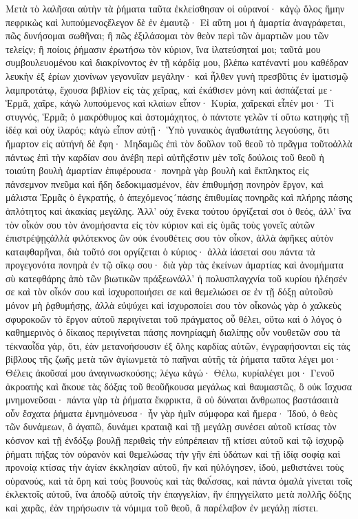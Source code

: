 Μετὰ τὸ λαλῆσαι αὐτὴν τὰ ῥήματα ταῦτα ἐκλείσθησαν οἱ οὐρανοί· κἀγῲ ὅλος ἤμην πεφρικὼς καὶ λυπούμενοςἔλεγον δὲ ἐν ἐμαυτῷ· Εἰ αὕτη μοι ἡ ἁμαρτία ἀναγράφεται, πῶς δυνήσομαι σωθῆναι; ἢ πῶς ἐξιλάσομαι τὸν θεὸν περὶ τῶν ἁμαρτιῶν μου τῶν τελείςν; ἢ ποίοις ῥήμασιν ἐρωτήσω τὸν κύριον, ἵνα ἱλατεύσηταί μοι; ταῦτά μου συμβουλευομένου καὶ διακρίνοντος ἐν τῇ κάρδίᾳ μου, βλέπω κατέναντί μου καθέδραν λευκὴν ἐξ ἐρίων χιονίνων γεγονυῖαν μεγάλην· καὶ ἦλθεν γυνὴ πρεσβῦτις ἐν ἱματισμῷ λαμπροτάτῳ, ἔχουσα βιβλίον εἰς τὰς χεῖρας, καὶ ἐκάθισεν μόνη καὶ ἀσπάζεταί με· Ἑρμᾶ, χαῖρε, κἀγὼ λυπούμενος καὶ κλαίων εἶπον· Κυρία, χαῖρεκαὶ εἶπέν μοι· Τί στυγνός, Ἑρμᾶ; ὁ μακρόθυμος καὶ ἀστομάχητος, ὁ πάντοτε γελῶν τί οὕτω κατηφὴς τῇ ἰδέᾳ καὶ οὐχ ἱλαρός; κἀγὼ εἶπον αὐτῇ· Ὑπὸ γυναικὸς ἀγαθωτάτης λεγούσης, ὅτι ἥμαρτον εἰς αὐτήνἡ δὲ ἔφη· Μηδαμῶς ἐπὶ τὸν δοῦλον τοῦ θεοῦ τὸ πρᾶγμα τοῦτοἀλλὰ πάντως ἐπὶ τὴν καρδίαν σου ἀνέβη περὶ αὐτῆςἔστιν μὲν τοῖς δούλοις τοῦ θεοῦ ἡ τοιαύτη βουλὴ ἁμαρτίαν ἐπιφέρουσα· πονηρὰ γὰρ βουλὴ καὶ ἔκπληκτος εἰς πάνσεμνον πνεῦμα καὶ ἤδη δεδοκιμασμένον, ἐὰν ἐπιθυμήσῃ πονηρὸν ἔργον, καὶ μάλιστα Ἑρμᾶς ὁ ἐγκρατής, ὁ ἀπεχόμενος´πάσης ἐπιθυμίας πονηρᾶς καὶ πλήρης πάσης ἁπλότητος καὶ ἀκακίας μεγάλης.
Ἀλλ’ οὐχ ἕνεκα τούτου ὀργίζεταί σοι ὁ θεός, ἀλλ’ ἵνα τὸν οἶκόν σου τὸν ἀνομήσαντα εἰς τὸν κύριον καὶ εἰς ὑμᾶς τοὺς γονεῖς αὐτῶν ἐπιστρέψῃςἀλλὰ φιλότεκνος ὢν οὐκ ἐνουθέτεις σου τὸν οἶκον, ἀλλὰ ἀφῆκες αὐτὸν καταφθαρῆναι, διὰ τοῦτό σοι οργίζεται ὁ κύριος· ἀλλὰ ἰάσεταί σου πάντα τὰ προγεγονότα πονηρὰ ἐν τῷ οἴκῳ σου· διὰ γὰρ τὰς ἐκείνων ἁμαρτίας καὶ ἀνομήματα σὺ κατεφθάρης ἀπὸ τῶν βιωτικῶν πράξεωνἀλλ’ ἡ πολυσπλαγχνία τοῦ κυρίου ἠλέησέν σε καὶ τὸν οἶκόν σου καὶ ἰσχυροποιήσει σε καὶ θεμελιώσει σε ἐν τῇ δόξῃ αὐτοῦσὺ μόνον μὴ ῥᾳθυμήσῃς, ἀλλὰ εὐψύχει καὶ ἰσχυροποίει σου τὸν οἶκονὡς γὰρ ὁ χαλκεὺς σφυροκοῶν τὸ ἔργον αὐτοῦ περιγίνεται τοῦ πράγματος οὗ θέλει, οὕτω καὶ ὁ λόγος ὁ καθημερινὸς ὁ δίκαιος περιγίνεται πάσης πονηρίαςμὴ διαλίπῃς οὖν νουθετῶν σου τὰ τέκναοἶδα γάρ, ὅτι, ἐὰν μετανοήσουσιν ἐξ ὅλης καρδίας αὐτῶν, ἐνγραφήσονται εἰς τὰς βίβλους τῆς ζωῆς μετὰ τῶν ἁγίωνμετὰ τὸ παῆναι αὐτῆς τὰ ῥήματα ταῦτα λέγει μοι· Θέλεις ἀκοῦσαί μου ἀναγινωσκούσης; λέγω κἀγώ· Θέλω, κυρίαλέγει μοι· Γενοῦ ἀκροατὴς καὶ ἄκουε τὰς δόξας τοῦ θεοῦἤκουσα μεγάλως καὶ θαυμαστῶς, ὃ οὐκ ἴσχυσα μνημονεῦσαι· πάντα γὰρ τὰ ῥήματα ἔκφρικτα, ἃ οὐ δύναται ἄνθρωπος βαστάσαιτὰ οὖν ἔσχατα ῥήματα ἐμνημόνευσα· ἦν γὰρ ἡμῖν σύμφορα καὶ ἥμερα· Ἰδού, ὁ θεὸς τῶν δυνάμεων, ὃ ἀγαπῶ, δυνάμει κραταιᾷ καὶ τῇ μεγάλῃ συνέσει αὐτοῦ κτίσας τὸν κόσνον καὶ τῇ ἐνδόξῳ βουλῇ περιθεὶς τὴν εὐπρέπειαν τῇ κτίσει αὐτοῦ καὶ τῷ ἰσχυρῷ ῥήματι πήξας τὸν οὐρανὸν καὶ θεμελώσας τὴν γῆν ἐπὶ ὑδάτων καὶ τῇ ἰδίᾳ σοφίᾳ καὶ προνοίᾳ κτίσας τὴν ἁγίαν ἐκκλησίαν αὐτοῦ, ἣν καὶ ηὐλόγησεν, ἰδού, μεθιστάνει τοὺς οὐρανούς, καὶ τὰ ὄρη καὶ τοὺς βουνοὺς καὶ τὰς θαλ́σσας, καὶ πάντα ὁμαλὰ γίνεται τοῖς ἐκλεκτοῖς αὐτοῦ, ἵνα ἀποδῷ αὐτοῖς τὴν ἐπαγγελίαν, ἣν ἐπηγγείλατο μετὰ πολλῆς δόξης καὶ χαρᾶς, ἐὰν τηρήσωσιν τὰ νόμιμα τοῦ θεοῦ, ἃ παρέλαβον ἐν μεγάλῃ πίστει.
